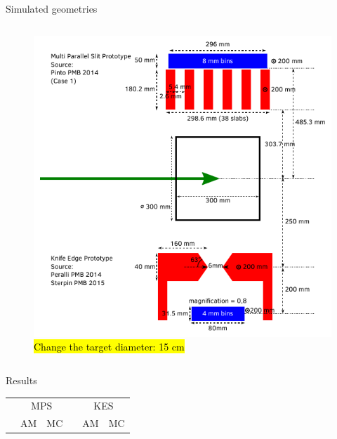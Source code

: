 \documentclass[final]{beamer} %
\begin{document}
\begin{frame}{}
\begin{columns}[t]
\begin{column}{0.49\textwidth}
\begin{block}{Simulated geometries}
\begin{columns}[t]
				\begin{column}{0.49\textwidth}
					\begin{figure}
						\includegraphics[width=\textwidth]{./figures/detectors_cyl}			
						\caption{\hl{Change the target diameter: 15 cm}}
						\label{CamerasScheme}
					\end{figure}					
				\end{column}				

			\end{columns}

	  \end{block}		
		
		\begin{block}{Results}
			{}
			\begin{table}[h]
			\centering
			\begin{tabular}{llllll}
				\midrule
							& \multicolumn{2}{c}{MPS}												&& \multicolumn{2}{c}{KES}										\\
				\cline{2-3}\cline{5-6}
							& AM 											& MC 									&& AM 										& MC								\\
				\midrule


\end{tabular}
\end{table}
\end{block}
\end{column}
\end{columns}
\end{frame}
\end{document}

